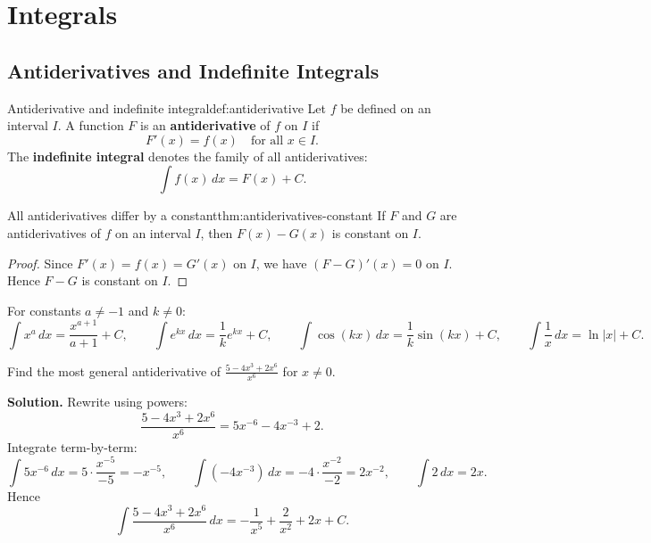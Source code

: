 
\section{Integrals}

\subsection{Antiderivatives and Indefinite Integrals}

\begin{definition}{Antiderivative and indefinite integral}{def:antiderivative}
Let $f$ be defined on an interval $I$. A function $F$ is an \textbf{antiderivative} of $f$ on $I$ if
\[
F'(x)=f(x)\quad \text{for all }x\in I.
\]
The \textbf{indefinite integral} denotes the family of all antiderivatives:
\[
\int f(x)\,dx = F(x)+C.
\]
\end{definition}

\begin{theorem}{All antiderivatives differ by a constant}{thm:antiderivatives-constant}
If $F$ and $G$ are antiderivatives of $f$ on an interval $I$, then $F(x)-G(x)$ is constant on $I$.
\end{theorem}

\begin{proof}
Since $F'(x)=f(x)=G'(x)$ on $I$, we have $(F-G)'(x)=0$ on $I$. Hence $F-G$ is constant on $I$.
\end{proof}

\begin{keyformula}[title={Key Formula: Basic antiderivative library}]
For constants $a\neq -1$ and $k\neq 0$:
\[
\int x^{a}\,dx=\frac{x^{a+1}}{a+1}+C,\qquad
\int e^{kx}\,dx=\frac{1}{k}e^{kx}+C,\qquad
\int \cos(kx)\,dx=\frac{1}{k}\sin(kx)+C,\qquad
\int \frac{1}{x}\,dx=\ln|x|+C.
\]
\end{keyformula}

\begin{examplebox}[title={Worked Example: General antiderivative (power simplification)}]
Find the most general antiderivative of $\displaystyle \frac{5-4x^3+2x^6}{x^6}$ for $x\neq 0$.

\textbf{Solution.}
Rewrite using powers:
\[
\frac{5-4x^3+2x^6}{x^6}=5x^{-6}-4x^{-3}+2.
\]
Integrate term-by-term:
\[
\int 5x^{-6}\,dx = 5\cdot \frac{x^{-5}}{-5}=-x^{-5},\qquad
\int (-4x^{-3})\,dx=-4\cdot \frac{x^{-2}}{-2}=2x^{-2},\qquad
\int 2\,dx=2x.
\]
Hence
\[
\int \frac{5-4x^3+2x^6}{x^6}\,dx = -\frac{1}{x^5}+\frac{2}{x^2}+2x+C.
\]
\end{examplebox}

